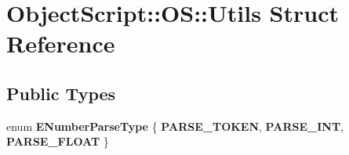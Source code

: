 \hypertarget{struct_object_script_1_1_o_s_1_1_utils}{}\section{Object\+Script\+:\+:OS\+:\+:Utils Struct Reference}
\label{struct_object_script_1_1_o_s_1_1_utils}
\subsection*{Public Types}
\begin{DoxyCompactItemize}
\item 
enum {\bfseries E\+Number\+Parse\+Type} \{ {\bfseries P\+A\+R\+S\+E\+\_\+\+T\+O\+K\+EN}, 
{\bfseries P\+A\+R\+S\+E\+\_\+\+I\+NT}, 
{\bfseries P\+A\+R\+S\+E\+\_\+\+F\+L\+O\+AT}
 \}\hypertarget{struct_object_script_1_1_o_s_1_1_utils_a7940d34d4c532f388d4eb51e923b5e51}{}\label{struct_object_script_1_1_o_s_1_1_utils_a7940d34d4c532f388d4eb51e923b5e51}

\end{DoxyCompactItemize}
